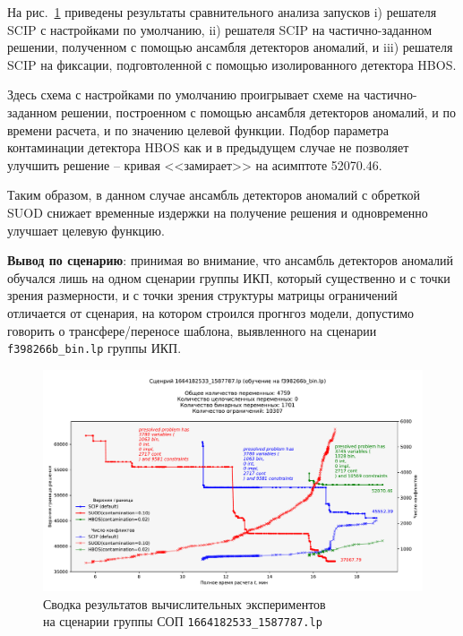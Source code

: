 \documentclass[%
	11pt,
	a4paper,
	utf8,
		]{article}
\begin{document}
На рис.~\ref{fig:1664182533_1587787} приведены результаты сравнительного анализа запусков i) решателя SCIP с настройками по умолчанию, ii) решателя SCIP на частично-заданном решении, полученном с помощью ансамбля детекторов аномалий, и iii) решателя SCIP на фиксации, подговтоленной с помощью изолированного детектора HBOS.

Здесь схема с настройками по умолчанию проигрывает схеме на частично-заданном решении, построенном с помощью ансамбля детекторов аномалий, и по времени расчета, и по значению целевой функции. Подбор параметра контаминации детектора HBOS как и в предыдущем случае не позволяет улучшить решение -- кривая <<замирает>> на асимптоте 52070.46.

Таким образом, в данном случае ансамбль детекторов аномалий с обреткой SUOD снижает временные издержки на получение решения и одновременно улучшает целевую функцию.

\textbf{Вывод по сценарию}: принимая во внимание, что ансамбль детекторов аномалий обучался лишь на одном сценарии группы ИКП, который существенно и с точки зрения размерности, и с точки зрения структуры матрицы ограничений отличается от сценария, на котором строился прогнгоз модели, допустимо говорить о трансфере/переносе шаблона, выявленного на сценарии \texttt{f398266b\_bin.lp} группы ИКП.

\begin{figure}[!h]
	\centering
	    \includegraphics[scale=0.535]{figures/1664182533_1587787.pdf}
	    \caption{ Сводка результатов вычислительных экспериментов \\на сценарии группы СОП \texttt{1664182533\_1587787.lp} }\label{fig:1664182533_1587787}
\end{figure}
\end{document}

